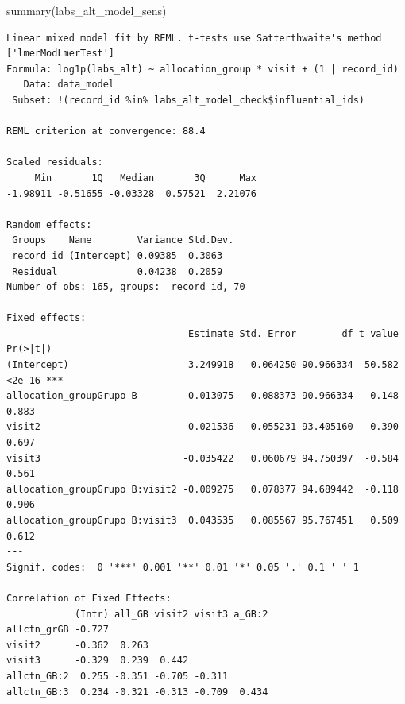 \documentclass[
  12pt,
]{article}
\newenvironment{Shaded}{\begin{snugshade}}{\end{snugshade}}
\newcommand{\FunctionTok}[1]{\textcolor[rgb]{0.28,0.35,0.67}{#1}}
\newcommand{\NormalTok}[1]{\textcolor[rgb]{0.00,0.23,0.31}{#1}}
\newcommand{\SpecialCharTok}[1]{\textcolor[rgb]{0.37,0.37,0.37}{#1}}
\begin{document}
\begin{Shaded}
\begin{Highlighting}[]
\FunctionTok{summary}\NormalTok{(labs\_alt\_model\_sens)}
\end{Highlighting}
\end{Shaded}

\begin{verbatim}
Linear mixed model fit by REML. t-tests use Satterthwaite's method ['lmerModLmerTest']
Formula: log1p(labs_alt) ~ allocation_group * visit + (1 | record_id)
   Data: data_model
 Subset: !(record_id %in% labs_alt_model_check$influential_ids)

REML criterion at convergence: 88.4

Scaled residuals: 
     Min       1Q   Median       3Q      Max 
-1.98911 -0.51655 -0.03328  0.57521  2.21076 

Random effects:
 Groups    Name        Variance Std.Dev.
 record_id (Intercept) 0.09385  0.3063  
 Residual              0.04238  0.2059  
Number of obs: 165, groups:  record_id, 70

Fixed effects:
                                Estimate Std. Error        df t value Pr(>|t|)    
(Intercept)                     3.249918   0.064250 90.966334  50.582   <2e-16 ***
allocation_groupGrupo B        -0.013075   0.088373 90.966334  -0.148    0.883    
visit2                         -0.021536   0.055231 93.405160  -0.390    0.697    
visit3                         -0.035422   0.060679 94.750397  -0.584    0.561    
allocation_groupGrupo B:visit2 -0.009275   0.078377 94.689442  -0.118    0.906    
allocation_groupGrupo B:visit3  0.043535   0.085567 95.767451   0.509    0.612    
---
Signif. codes:  0 '***' 0.001 '**' 0.01 '*' 0.05 '.' 0.1 ' ' 1

Correlation of Fixed Effects:
            (Intr) all_GB visit2 visit3 a_GB:2
allctn_grGB -0.727                            
visit2      -0.362  0.263                     
visit3      -0.329  0.239  0.442              
allctn_GB:2  0.255 -0.351 -0.705 -0.311       
allctn_GB:3  0.234 -0.321 -0.313 -0.709  0.434
\end{verbatim}

\begin{Shaded}
\end{Shaded}
\end{document}
